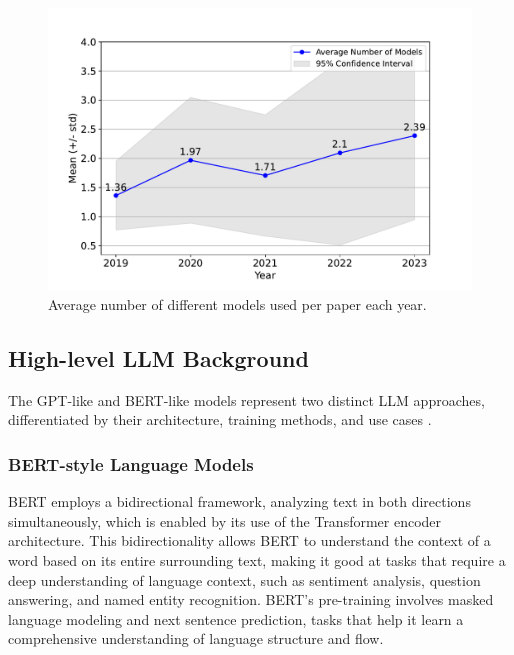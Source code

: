 \documentclass[fleqn,10pt]{olplainarticle}
\begin{document}
\begin{figure}[!ht]
\begin{center}
\includegraphics[scale=0.4]{visuals/new_pdf/LLM_number_per_paper_over_time_2024.pdf} %
\caption{Average number of different models used per paper each year.}
\label{fig:LLM_avg_number_over_year}
\end{center}
\end{figure}

\subsection*{High-level LLM Background}
The GPT-like and BERT-like models represent two distinct LLM approaches, differentiated by their architecture, training methods, and use cases \citep{yang2023harnessing}. 

\subsubsection*{BERT-style Language Models}
BERT employs a bidirectional framework, analyzing text in both directions simultaneously, which is enabled by its use of the Transformer encoder architecture. This bidirectionality allows BERT to understand the context of a word based on its entire surrounding text, making it good at tasks that require a deep understanding of language context, such as sentiment analysis, question answering, and named entity recognition. BERT's pre-training involves masked language modeling and next sentence prediction, tasks that help it learn a comprehensive understanding of language structure and flow.
\end{document}
